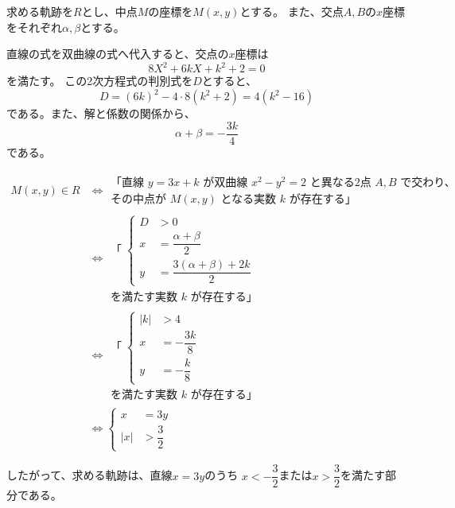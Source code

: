 求める軌跡を$R$とし、中点$M$の座標を$M(x,y)$とする。
また、交点$A,B$の$x$座標をそれぞれ$\alpha,\beta$とする。

直線の式を双曲線の式へ代入すると、交点の$x$座標は
\[
8X^2+6kX+k^2+2=0
\]
を満たす。
この2次方程式の判別式を$D$とすると、
\[
D=(6k)^2-4\cdot8(k^2+2)
  =4(k^2-16)
\]
である。また、解と係数の関係から、
\[
\alpha+\beta=-\dfrac{3k}{4}
\]
である。

\[
\begin{aligned}
M(x,y)\in R
&\Longleftrightarrow
\begin{gathered}
\text{「直線 }y=3x+k\text{ が双曲線 }x^2-y^2=2\text{ と異なる2点 }A,B\text{ で交わり、}\\
\text{その中点が }M(x,y)\text{ となる実数 }k\text{ が存在する」}
\end{gathered}\\
&\Longleftrightarrow
\begin{gathered}
\text{「}\;
\left\{
\begin{aligned}
D&>0\\
x&=\dfrac{\alpha+\beta}{2}\\
y&=\dfrac{3(\alpha+\beta)+2k}{2}
\end{aligned}
\right.\\
\text{を満たす実数 }k\text{ が存在する」}
\end{gathered}\\
&\Longleftrightarrow
\begin{gathered}
\text{「}\;
\left\{
\begin{aligned}
|k|&>4\\
x&=-\dfrac{3k}{8}\\
y&=-\dfrac{k}{8}
\end{aligned}
\right.\\
\text{を満たす実数 }k\text{ が存在する」}
\end{gathered}\\
&\Longleftrightarrow
\left\{
\begin{aligned}
x&=3y\\
|x|&>\dfrac{3}{2}
\end{aligned}
\right.
\end{aligned}
\]

したがって、求める軌跡は、直線$x=3y$のうち
$x<-\dfrac{3}{2}$または$x>\dfrac{3}{2}$を満たす部分である。
